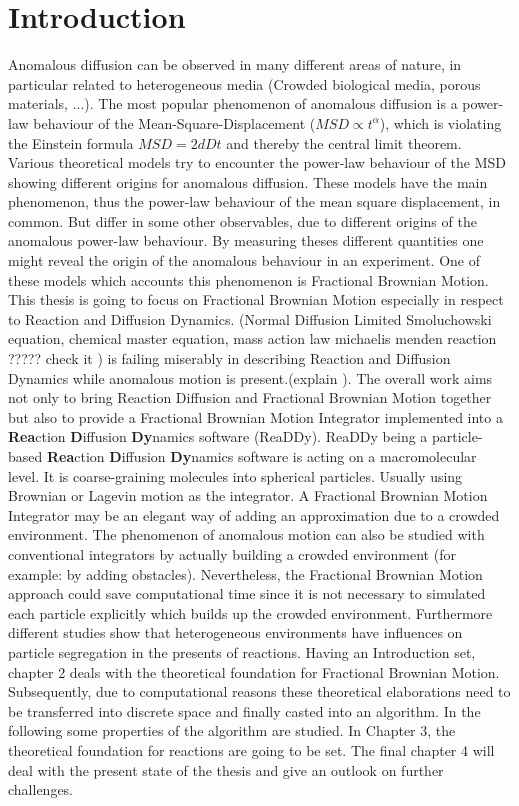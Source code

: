 \documentclass[
  a4paper,BCOR10mm,oneside,
  bibtotoc,idxtotoc,
  headsepline,footsepline,%
  fleqn,openbib
]{scrbook}
\begin{document}
\chapter{Introduction}
Anomalous diffusion can be observed in many different areas of nature, in particular related to heterogeneous media (Crowded biological media, porous materials, ...). The most popular phenomenon of anomalous diffusion is a power-law behaviour of the Mean-Square-Displacement ($MSD\propto t^{\alpha}$), which is violating the Einstein formula $MSD=2 d D t$ and thereby the central limit theorem. Various theoretical models try to encounter the power-law behaviour of the MSD showing different origins for anomalous diffusion. These models have the main phenomenon, thus the power-law behaviour of the mean square displacement, in common. But differ in some other observables, due to different origins of the anomalous power-law behaviour. By measuring theses different quantities one might reveal the origin of the anomalous behaviour in an experiment.\newline
One of these models which accounts this phenomenon is Fractional Brownian Motion. This thesis is going to focus on Fractional Brownian Motion especially in respect to Reaction and Diffusion Dynamics. (Normal Diffusion Limited Smoluchowski equation, chemical master equation, mass action law michaelis menden reaction ????? check it ) is failing miserably in describing Reaction and Diffusion Dynamics while anomalous motion is present.(explain ). The overall work aims not only to bring Reaction Diffusion and Fractional Brownian Motion together but also to provide a Fractional Brownian Motion Integrator implemented into a \textbf{Rea}ction \textbf{D}iffusion \textbf{Dy}namics software (ReaDDy). ReaDDy being a particle-based \textbf{Rea}ction \textbf{D}iffusion \textbf{Dy}namics software is acting on a macromolecular level. It is coarse-graining molecules into spherical particles. Usually using Brownian or Lagevin motion as the integrator. A Fractional Brownian Motion Integrator may be an elegant way of adding an approximation due to a crowded environment. The phenomenon of anomalous motion can also be studied with conventional integrators by actually building a crowded environment (for example: by adding obstacles). Nevertheless, the Fractional Brownian Motion approach could save computational time since it is not necessary to simulated each particle  explicitly which builds up the crowded environment. Furthermore different studies show that heterogeneous environments have influences on particle segregation in the presents of reactions.\newline
Having an Introduction set, chapter 2 deals with the theoretical foundation for Fractional Brownian Motion. Subsequently, due to computational reasons these theoretical elaborations need to be transferred into discrete space and finally casted into an algorithm. In the following some properties of the algorithm are studied. In Chapter 3, the theoretical foundation for reactions are going to be set. The final chapter 4 will deal with the present state of the thesis and give an outlook on further challenges.  
\end{document}
